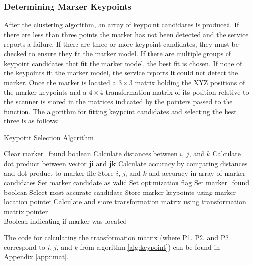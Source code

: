 \subsubsection{Determining Marker Keypoints}
After the clustering algorithm, an array of keypoint candidates is produced. If there are less than three points the marker has not been detected and the service reports a failure. If there are three or more keypoint candidates, they must be checked to ensure they fit the marker model. If there are multiple groups of keypoint candidates that fit the marker model, the best fit is chosen. If none of the keypoints fit the marker model, the service reports it could not detect the marker. Once the marker is located a $3\times3$ matrix holding the XYZ positions of the marker keypoints and a $4\times4$ transformation matrix of its position relative to the scanner is stored in the matrices indicated by the pointers passed to the function. The algorithm for fitting keypoint candidates and selecting the best three is as follows:
\begin{spacing}{0.8}
\begin{algorithm}[H]
\caption{Keypoint Selection Algorithm}
\label{alg:keypoint}
\begin{algorithmic}[1]
\begin{raggedright}
\State Clear marker\_found boolean
\State Calculate distances between $i$, $j$, and $k$
\State Calculate dot product between vector $\mathbf{ji}$ and $\mathbf{jk}$
\State Calculate accuracy by comparing distances and dot product to marker file
\State Store $i$, $j$, and $k$ and accuracy in array of marker candidates
\State Set marker candidate as valid
\State Set optimization flag
\EndIf
\EndIf
\EndIf
\EndFor
\EndFor
\EndFor
{}
\State Set marker\_found boolean
\State Select most accurate candidate
\EndIf
\State Store marker keypoints using marker location pointer 
\State Calculate and store transformation matrix using transformation matrix pointer \
\EndIf
\EndFunction\\
\Return Boolean indicating if marker was located
\end{raggedright}
\end{algorithmic}
\end{algorithm}
\end{spacing}
The code for calculating the transformation matrix (where P1, P2, and P3 correspond to $i$, $j$, and $k$ from algorithm \ref{alg:keypoint}) can be found in Appendix \ref{app:tmat}.\\


